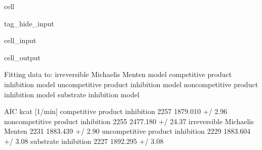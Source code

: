\documentclass[letterpaper,10pt,english]{jupyterBook}
\begin{document}
\begin{sphinxuseclass}{cell}
\begin{sphinxuseclass}{tag_hide_input}\begin{sphinxVerbatimInput}

\begin{sphinxuseclass}{cell_input}
\begin{sphinxVerbatim}[commandchars=\\\{\}]
  

\end{sphinxVerbatim}

\end{sphinxuseclass}\end{sphinxVerbatimInput}
\begin{sphinxVerbatimOutput}

\begin{sphinxuseclass}{cell_output}
\begin{sphinxVerbatim}[commandchars=\\\{\}]
Fitting data to:
 \PYGZhy{} irreversible Michaelis Menten model
 \PYGZhy{} competitive product inhibition model
 \PYGZhy{} uncompetitive product inhibition model
 \PYGZhy{} non\PYGZhy{}competitive product inhibition model
 \PYGZhy{} substrate inhibition model
\end{sphinxVerbatim}

\begin{sphinxVerbatim}[commandchars=\\\{\}]
                                     AIC         kcat [1/min]  \PYGZbs{}
competitive product inhibition     \PYGZhy{}2257   1879.010 +/\PYGZhy{} 2.96\PYGZpc{}   
non\PYGZhy{}competitive product inhibition \PYGZhy{}2255  2477.180 +/\PYGZhy{} 24.37\PYGZpc{}   
irreversible Michaelis Menten      \PYGZhy{}2231   1883.439 +/\PYGZhy{} 2.90\PYGZpc{}   
uncompetitive product inhibition   \PYGZhy{}2229   1883.604 +/\PYGZhy{} 3.08\PYGZpc{}   
substrate inhibition               \PYGZhy{}2227   1892.295 +/\PYGZhy{} 3.08\PYGZpc{}   


\end{sphinxVerbatim}
\end{sphinxuseclass}
\end{sphinxVerbatimOutput}
\end{sphinxuseclass}
\end{sphinxuseclass}
\end{document}
